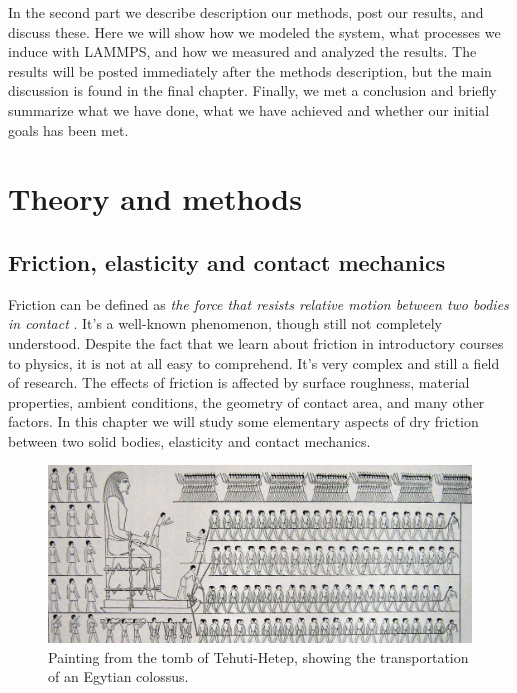 \documentclass[twoside,english]{uiofysmaster}
\begin{document}
In the second part we describe description our methods, post our results, and discuss these.
Here we will show how we modeled the system, what processes we induce with LAMMPS, and how we measured and analyzed the results. 
The results will be posted immediately after the methods description, but the main discussion is found in the final chapter. 
Finally, we met a conclusion and briefly summarize what we have done, what we have achieved and whether our initial goals has been met.
    
	





\part{Theory and methods}


\chapter{Friction, elasticity and contact mechanics}
Friction can be defined as \textit{the force that resists relative motion between two bodies in contact} \cite{frictionDefinition}. 
It's a well-known phenomenon, though still not completely understood.
Despite the fact that we learn about friction in introductory courses to physics, it is not at all easy to comprehend. 
It's very complex and still a field of research.
The effects of friction is affected by surface roughness, material properties, ambient conditions, the geometry of contact area, and many other factors. 
In this chapter we will study some elementary aspects of dry friction between two solid bodies, elasticity and contact mechanics. 


\begin{figure}[H]
	\centering
	\includegraphics[width=0.99\linewidth]{figures/friction/Colossus.jpg}
	\caption{Painting from the tomb of Tehuti-Hetep, showing the transportation of an Egytian colossus.}
	\label{fig:Colossus}
\end{figure}
\end{document}
